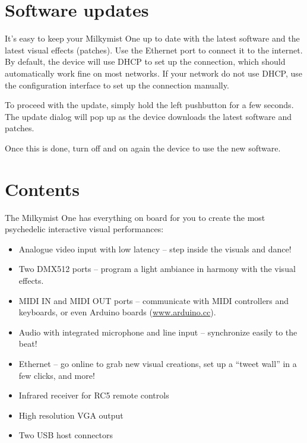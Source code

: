 \documentclass{leaflet}
\begin{document}
\section{Software updates}
It's easy to keep your Milkymist One up to date with the latest software and the latest visual effects (patches). Use the Ethernet port to connect it to the internet. By default, the device will use DHCP to set up the connection, which should automatically work fine on most networks. If your network do not use DHCP, use the configuration interface to set up the connection manually.

To proceed with the update, simply hold the left pushbutton for a few seconds. The update dialog will pop up as the device downloads the latest software and patches.

Once this is done, turn off and on again the device to use the new software.

\section{Contents}
The Milkymist One has everything on board for you to create the most psychedelic interactive visual performances:
\begin{itemize}
\item Analogue video input with low latency -- step inside the visuals and dance!
\item Two DMX512 ports -- program a light ambiance in harmony with the visual effects.
\item MIDI IN and MIDI OUT ports -- communicate with MIDI controllers and keyboards, or even Arduino boards (\url{www.arduino.cc}).
\item Audio with integrated microphone and line input -- synchronize easily to the beat!
\item Ethernet -- go online to grab new visual creations, set up a ``tweet wall'' in a few clicks, and more!
\item Infrared receiver for RC5 remote controls
\item High resolution VGA output
\item Two USB host connectors
\end{itemize}
\end{document}
